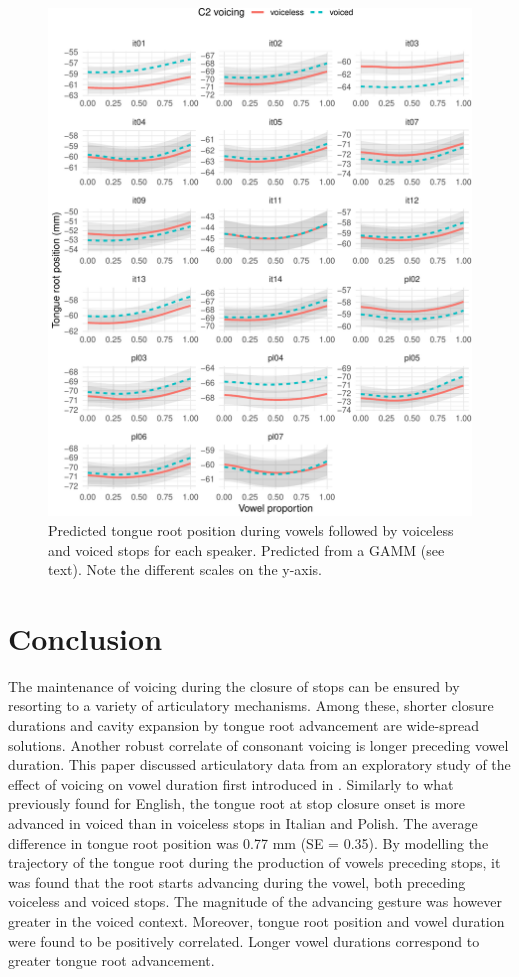 \documentclass[12pt,]{article}
\begin{document}
\begin{figure}
\includegraphics[width=\linewidth]{2018-tra_files/figure-latex/tra-gam-s-ar-plot-1} \caption{Predicted tongue root position during vowels followed by voiceless and voiced stops for each speaker. Predicted from a GAMM (see text). Note the different scales on the y-axis.}\label{f:tra-gam-s-ar-plot}
\end{figure}

\hypertarget{conclusion}{%
\section{Conclusion}\label{conclusion}}

The maintenance of voicing during the closure of stops can be ensured by
resorting to a variety of articulatory mechanisms. Among these, shorter
closure durations and cavity expansion by tongue root advancement are
wide-spread solutions. Another robust correlate of consonant voicing is
longer preceding vowel duration. This paper discussed articulatory data
from an exploratory study of the effect of voicing on vowel duration
first introduced in \citet{coretta2018j}. Similarly to what previously
found for English, the tongue root at stop closure onset is more
advanced in voiced than in voiceless stops in Italian and Polish. The
average difference in tongue root position was 0.77 mm (SE = 0.35). By
modelling the trajectory of the tongue root during the production of
vowels preceding stops, it was found that the root starts advancing
during the vowel, both preceding voiceless and voiced stops. The
magnitude of the advancing gesture was however greater in the voiced
context. Moreover, tongue root position and vowel duration were found to
be positively correlated. Longer vowel durations correspond to greater
tongue root advancement.
\end{document}
